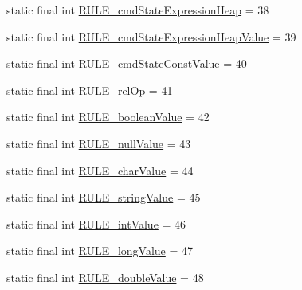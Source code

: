 \begin{DoxyCompactItemize}
\item 
static final int \hyperlink{classgov_1_1nasa_1_1jpf_1_1inspector_1_1server_1_1expression_1_1parser_1_1_expression_grammar_parser_a496c646278e4c226f6e9df4e60ae5780}{R\+U\+L\+E\+\_\+cmd\+State\+Expression\+Heap} = 38
\item 
static final int \hyperlink{classgov_1_1nasa_1_1jpf_1_1inspector_1_1server_1_1expression_1_1parser_1_1_expression_grammar_parser_ae4872c4266ee90116e292789ebb21a83}{R\+U\+L\+E\+\_\+cmd\+State\+Expression\+Heap\+Value} = 39
\item 
static final int \hyperlink{classgov_1_1nasa_1_1jpf_1_1inspector_1_1server_1_1expression_1_1parser_1_1_expression_grammar_parser_af3ae78a32915ebca5b8aa84a81297b26}{R\+U\+L\+E\+\_\+cmd\+State\+Const\+Value} = 40
\item 
static final int \hyperlink{classgov_1_1nasa_1_1jpf_1_1inspector_1_1server_1_1expression_1_1parser_1_1_expression_grammar_parser_aa8402628ef1825db2eb47f62aa02dcf0}{R\+U\+L\+E\+\_\+rel\+Op} = 41
\item 
static final int \hyperlink{classgov_1_1nasa_1_1jpf_1_1inspector_1_1server_1_1expression_1_1parser_1_1_expression_grammar_parser_adb15b13cba7d1b83b3c4689f6c407160}{R\+U\+L\+E\+\_\+boolean\+Value} = 42
\item 
static final int \hyperlink{classgov_1_1nasa_1_1jpf_1_1inspector_1_1server_1_1expression_1_1parser_1_1_expression_grammar_parser_a3f7a3a701df26f6159073e0fff3e6250}{R\+U\+L\+E\+\_\+null\+Value} = 43
\item 
static final int \hyperlink{classgov_1_1nasa_1_1jpf_1_1inspector_1_1server_1_1expression_1_1parser_1_1_expression_grammar_parser_a474167c380bcfc760d1dabdb78e2e3b0}{R\+U\+L\+E\+\_\+char\+Value} = 44
\item 
static final int \hyperlink{classgov_1_1nasa_1_1jpf_1_1inspector_1_1server_1_1expression_1_1parser_1_1_expression_grammar_parser_a32a1c33d369a2e4ffbc3534a15b425d1}{R\+U\+L\+E\+\_\+string\+Value} = 45
\item 
static final int \hyperlink{classgov_1_1nasa_1_1jpf_1_1inspector_1_1server_1_1expression_1_1parser_1_1_expression_grammar_parser_a27ed8e6e7e05caab3d5d303f168380a2}{R\+U\+L\+E\+\_\+int\+Value} = 46
\item 
static final int \hyperlink{classgov_1_1nasa_1_1jpf_1_1inspector_1_1server_1_1expression_1_1parser_1_1_expression_grammar_parser_a5007009d9a1e506fe44c257a2d30897a}{R\+U\+L\+E\+\_\+long\+Value} = 47
\item 
static final int \hyperlink{classgov_1_1nasa_1_1jpf_1_1inspector_1_1server_1_1expression_1_1parser_1_1_expression_grammar_parser_a0477c20cae33708174e66f4fd1b61a7d}{R\+U\+L\+E\+\_\+double\+Value} = 48

\end{DoxyCompactItemize}
